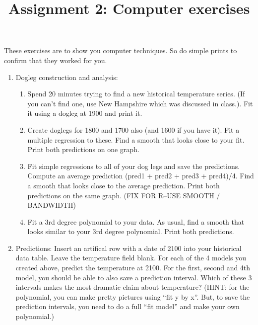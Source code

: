 \documentclass[11pt]{article}
\begin{document}
\title{Assignment 2: Computer exercises}

These exercises are to show you computer techniques.  So do simple
 prints to confirm that they worked for you.

\begin{enumerate}
\item Dogleg construction and analysis:
\begin{enumerate}
\item Spend 20 minutes trying to find a new historical temperature
series.  (If you can't find one, use New Hampshire which was discussed
in class.).   Fit it using a dogleg at 1900 and print it.
\item Create doglegs for 1800 and 1700 also (and 1600 if you have
it).  Fit a multiple regression to these.  Find a smooth that looks
close to your fit.  Print both predictions on one graph. 
\item Fit simple regressions to all of your dog legs and save the
predictions.  Compute an average prediction (pred1 + pred2 + pred3 +
pred4)/4.  Find a smooth that looks close to the average prediction.
Print both predictions on the same graph.  (FIX FOR R--USE SMOOTH / BANDWIDTH)
\item Fit a 3rd degree polynomial to your data.  As usual, find a
smooth that looks similar to your 3rd degree polynomial.  Print both
predictions. 
\end{enumerate}

\item Predictions: Insert an artifical row with a date of 2100 into
your historical data table.  Leave the temperature field blank.  For
each of the 4 models you created above, predict the temperature at
2100.   For the first, second and 4th model, you should be able to
also save a prediction interval.  Which of these 3 intervals makes the
most dramatic claim about temperature?  (HINT: for the polynomial, you
can make pretty pictures using ``fit y by x''.  But, to save the
prediction intervals, you need to do a full ``fit model'' and make
your own polynomial.)


\end{enumerate}
\end{document}
